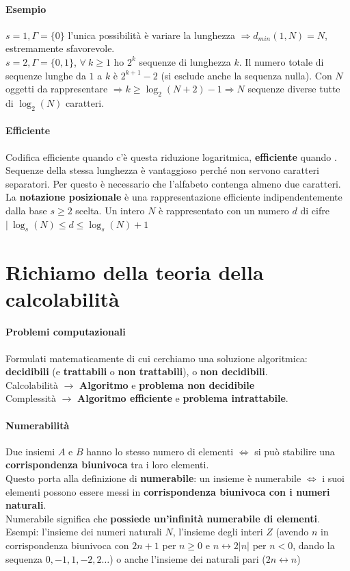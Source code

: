 \documentclass[10pt]{book}
\begin{document}
\paragraph{Esempio} $s = 1, \Gamma = \{0\}$ l'unica possibilità è variare la lunghezza $\Rightarrow d_{min}(1, N) = N$, estremamente sfavorevole.\\
$s = 2, \Gamma = \{0, 1\}$, $\forall\:k\geq 1$ ho $2^k$ sequenze di lunghezza $k$. Il numero totale di sequenze lunghe da $1$ a $k$ è $2^{k+1} - 2$ (si esclude anche la sequenza nulla). Con $N$ oggetti da rappresentare $\Rightarrow k \geq \log_2(N+2) - 1 \Rightarrow N$ sequenze diverse tutte di $\log_2(N)$ caratteri.
\paragraph{Efficiente} Codifica efficiente quando c'è questa riduzione logaritmica, \textbf{efficiente} quando \textbf{}. Sequenze della stessa lunghezza è vantaggioso perché non servono caratteri separatori. Per questo è necessario che l'alfabeto contenga almeno due caratteri.\\
La \textbf{notazione posizionale} è una rappresentazione efficiente indipendentemente dalla base $s \geq 2$ scelta. Un intero $N$ è rappresentato con un numero $d$ di cifre $|\: \log_s(N) \leq d \leq \log_s(N) + 1$
\section{Richiamo della teoria della calcolabilità}
\paragraph{Problemi computazionali} Formulati matematicamente di cui cerchiamo una soluzione algoritmica: \textbf{decidibili} (e \textbf{trattabili} o \textbf{non trattabili}), o \textbf{non decidibili}.\\
Calcolabilità $\rightarrow$ \textbf{Algoritmo} e \textbf{problema non decidibile}\\
Complessità $\rightarrow$ \textbf{Algoritmo efficiente} e \textbf{problema intrattabile}.
\paragraph{Numerabilità} Due insiemi $A$ e $B$ hanno lo stesso numero di elementi $\Leftrightarrow$ si può stabilire una \textbf{corrispondenza biunivoca} tra i loro elementi.\\
Questo porta alla definizione di \textbf{numerabile}: un insieme è numerabile $\Leftrightarrow$ i suoi elementi possono essere messi in \textbf{corrispondenza biunivoca con i numeri naturali}.\\
Numerabile significa che \textbf{possiede un'infinità numerabile di elementi}. Esempi: l'insieme dei numeri naturali $N$, l'insieme degli interi $Z$ (avendo $n$ in corrispondenza biunivoca con $2n + 1$ per $n\geq 0$ e $n \leftrightarrow 2|n|$ per $n < 0$, dando la sequenza $0, -1, 1, -2, 2\ldots$) o anche l'insieme dei naturali pari ($2n \leftrightarrow n$)
\end{document}
